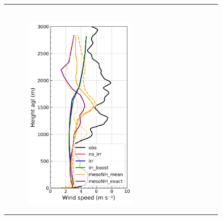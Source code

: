 \begin{figure}[hbtp]
{\begin{tabular}{@{}cccc@{}}
\begin{subfigure}[t]{0.283\textwidth}
        \end{subfigure} \\
        \begin{subfigure}[t]{0.382\textwidth}
            \caption{}
            \includegraphics[width=\textwidth]{images/chap5/profiles/profile_elsplans_wind_speed_1507_sensbins.png}
        \end{subfigure} &
        \begin{subfigure}[t]{0.283\textwidth}
            \caption{}

\end{subfigure}
\end{tabular}}
\end{figure}
